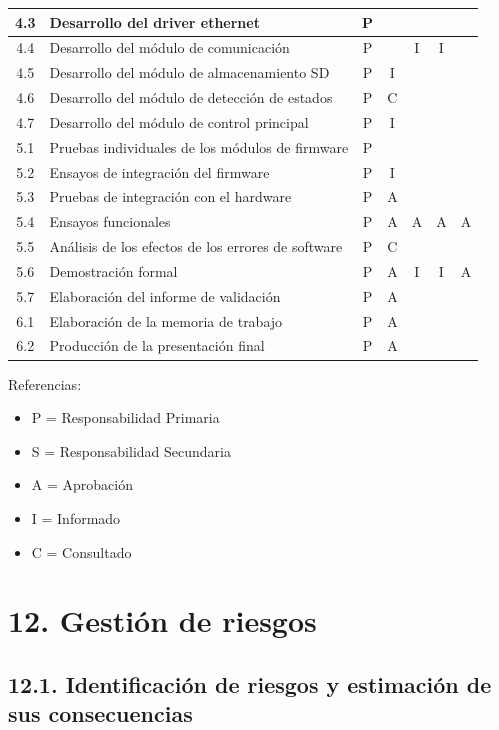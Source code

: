 \documentclass[11pt]{charter}
\begin{document}
\begin{table}[htpb]
{\begin{tabular}{|c|m{6cm}|c|c|c|c|c|}
 4.3 & Desarrollo del driver ethernet & P & & & & \\ \hline
 4.4 & Desarrollo del módulo de comunicación & P & & I & I & \\ \hline
 4.5 & Desarrollo del módulo de almacenamiento SD & P & I & & & \\ \hline
 4.6 & Desarrollo del módulo de detección de estados & P & C & & & \\ \hline
 4.7 & Desarrollo del módulo de control principal & P & I & & & \\ \hline
 5.1 & Pruebas individuales de los módulos de firmware & P & & & & \\ \hline
 5.2 & Ensayos de integración del firmware & P & I & & & \\ \hline
 5.3 & Pruebas de integración con el hardware & P & A & & & \\ \hline
 5.4 & Ensayos funcionales & P & A & A & A & A \\ \hline
 5.5 & Análisis de los efectos de los errores de software & P & C & & & \\ \hline
 5.6 & Demostración formal & P & A & I & I & A \\ \hline
 5.7 & Elaboración del informe de validación & P & A & & & \\ \hline 
 6.1 & Elaboración de la memoria de trabajo & P & A & & & \\ \hline 
 6.2 & Producción de la presentación final & P & A & & & \\ \hline 
\end{tabular}%
}
\end{table}

{\footnotesize
Referencias:
\begin{itemize}
	\item P = Responsabilidad Primaria
	\item S = Responsabilidad Secundaria
	\item A = Aprobación
	\item I = Informado
	\item C = Consultado
\end{itemize}
} %

\section{12. Gestión de riesgos}
\label{sec:riesgos}

\subsection*{12.1. Identificación de riesgos y estimación de sus consecuencias}
\end{document}
